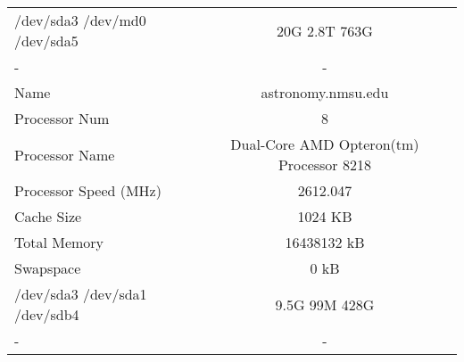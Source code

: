 \documentclass{article}
\begin{document}
\begin{table}
\begin{tabular}{l || c}
/dev/sda3 /dev/md0 /dev/sda5 & 20G 2.8T 763G \\
- & - \\
Name & astronomy.nmsu.edu \\
Processor Num & 8 \\
Processor Name & Dual-Core AMD Opteron(tm) Processor 8218 \\
Processor Speed (MHz) & 2612.047 \\
Cache Size & 1024 KB \\
Total Memory & 16438132 kB \\
Swapspace & 0 kB \\
/dev/sda3 /dev/sda1 /dev/sdb4 & 9.5G 99M 428G \\
- & - \\
\end{tabular}
\end{table}
\end{document}
